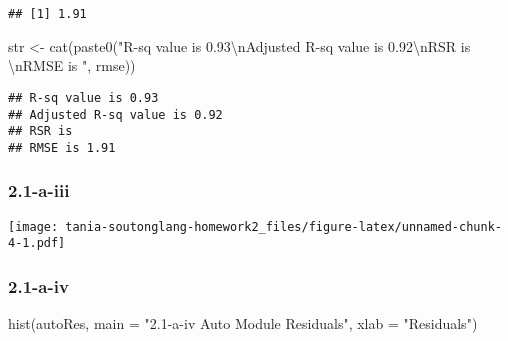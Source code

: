 \documentclass[
]{article}
\newenvironment{Shaded}{\begin{snugshade}}{\end{snugshade}}
\newcommand{\AttributeTok}[1]{\textcolor[rgb]{0.77,0.63,0.00}{#1}}
\newcommand{\FunctionTok}[1]{\textcolor[rgb]{0.00,0.00,0.00}{#1}}
\newcommand{\NormalTok}[1]{#1}
\newcommand{\OtherTok}[1]{\textcolor[rgb]{0.56,0.35,0.01}{#1}}
\newcommand{\SpecialCharTok}[1]{\textcolor[rgb]{0.00,0.00,0.00}{#1}}
\newcommand{\StringTok}[1]{\textcolor[rgb]{0.31,0.60,0.02}{#1}}
\begin{document}
\begin{verbatim}
## [1] 1.91
\end{verbatim}

\begin{Shaded}
\begin{Highlighting}[]
\NormalTok{str }\OtherTok{\textless{}{-}} \FunctionTok{cat}\NormalTok{(}\FunctionTok{paste0}\NormalTok{(}\StringTok{"R{-}sq value is 0.93}\SpecialCharTok{\textbackslash{}n}\StringTok{Adjusted R{-}sq value is 0.92}\SpecialCharTok{\textbackslash{}n}\StringTok{RSR is }\SpecialCharTok{\textbackslash{}n}\StringTok{RMSE is "}\NormalTok{, rmse))}
\end{Highlighting}
\end{Shaded}

\begin{verbatim}
## R-sq value is 0.93
## Adjusted R-sq value is 0.92
## RSR is 
## RMSE is 1.91
\end{verbatim}

\hypertarget{a-iii}{%
\subsubsection{2.1-a-iii}\label{a-iii}}

\begin{Shaded}
\end{Shaded}

\texttt{[image: tania-soutonglang-homework2\_files/figure-latex/unnamed-chunk-4-1.pdf]}

\hypertarget{a-iv}{%
\subsubsection{2.1-a-iv}\label{a-iv}}

\begin{Shaded}
\begin{Highlighting}[]
\FunctionTok{hist}\NormalTok{(autoRes, }\AttributeTok{main =} \StringTok{"2.1{-}a{-}iv Auto Module Residuals"}\NormalTok{, }\AttributeTok{xlab =} \StringTok{"Residuals"}\NormalTok{)}
\end{Highlighting}
\end{Shaded}
\end{document}
